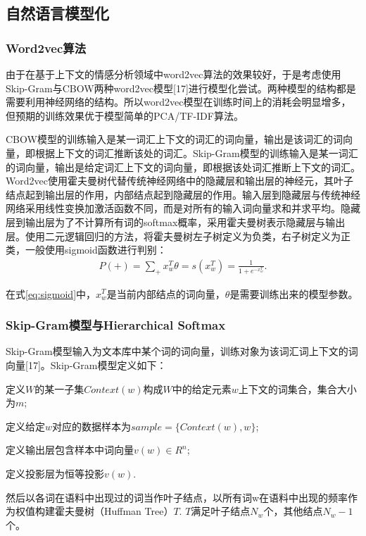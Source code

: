 \documentclass[UTF8]{csoarticle}
\begin{document}
\subsection{自然语言模型化}

\subsubsection{Word2vec算法}
由于在基于上下文的情感分析领域中word2vec算法的效果较好，于是考虑使用Skip-Gram与CBOW两种word2vec模型[17]进行模型化尝试。两种模型的结构都是需要利用神经网络的结构。所以word2vec模型在训练时间上的消耗会明显增多，但预期的训练效果优于模型简单的PCA/TF-IDF算法。

CBOW模型的训练输入是某一词汇上下文的词汇的词向量，输出是该词汇的词向量，即根据上下文的词汇推断该处的词汇。Skip-Gram模型的训练输入是某一词汇的词向量，输出是给定词汇上下文的词向量，即根据该处词汇推断上下文的词汇。Word2vec使用霍夫曼树代替传统神经网络中的隐藏层和输出层的神经元，其叶子结点起到输出层的作用，内部结点起到隐藏层的作用。输入层到隐藏层与传统神经网络采用线性变换加激活函数不同，而是对所有的输入词向量求和并求平均。隐藏层到输出层为了不计算所有词的softmax概率，采用霍夫曼树表示隐藏层与输出层。使用二元逻辑回归的方法，将霍夫曼树左子树定义为负类，右子树定义为正类，一般使用sigmoid函数进行判别：
\begin{align}\label{eq:sigmoid}
P(+)=\sum_+ {x_w^T \theta}= s(x_w^T )=\frac{1}{1+e^{-x_w^T}}.
\end{align}

在式\eqref{eq:sigmoid}中，$x_w^T$是当前内部结点的词向量，$\theta$是需要训练出来的模型参数。

\subsubsection{Skip-Gram模型与Hierarchical Softmax}

Skip-Gram模型输入为文本库中某个词的词向量，训练对象为该词汇词上下文的词向量[17]。Skip-Gram模型定义如下：

定义$W$的某一子集$Context(w)$构成$W$中的给定元素$w$上下文的词集合，集合大小为$m$;

定义给定$w$对应的数据样本为$sample=\{Context(w),w\}$;

定义输出层包含样本中词向量$v(w)\in R^n$;

定义投影层为恒等投影$v(w)$.

然后以各词在语料中出现过的词当作叶子结点，以所有词w在语料中出现的频率作为权值构建霍夫曼树（Huffman Tree）$T$. $T$满足叶子结点$N_w$个，其他结点$N_w-1$个。
\end{document}
